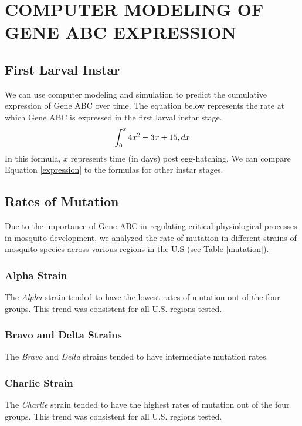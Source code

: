 \chapter{COMPUTER MODELING OF GENE ABC EXPRESSION}

\section{First Larval Instar}
We can use computer modeling and simulation to predict the cumulative expression of Gene ABC over time. The equation below represents the rate at which Gene ABC is expressed in the first larval instar stage.
\begin{equation}
	\centering
	\int_0^x 4x^2-3x+15, dx
	\label{expression}
\end{equation}
In this formula, $x$ represents time (in days) post egg-hatching. We can compare Equation \ref{expression} to the formulas for other instar stages. 

\section{Rates of Mutation}
Due to the importance of Gene ABC in regulating critical physiological processes in mosquito development, we analyzed the rate of mutation in different strains of mosquito species across various regions in the U.S (see Table \ref{mutation}).

\subsection{Alpha Strain}
The \textit{Alpha} strain tended to have the lowest rates of mutation out of the four groups. This trend was consistent for all U.S. regions tested.

\subsection{Bravo and Delta Strains}
The \textit{Bravo} and \textit{Delta} strains tended to have intermediate mutation rates. 

\subsection{Charlie Strain}
The \textit{Charlie} strain tended to have the highest rates of mutation out of the four groups. This trend was consistent for all U.S. regions tested.

